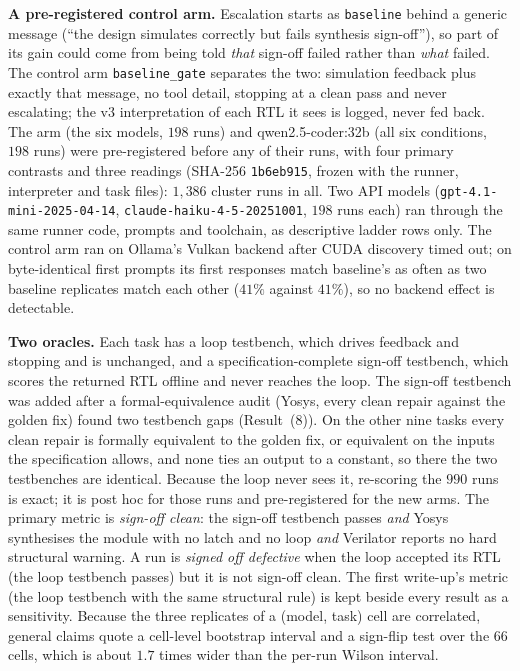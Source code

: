 \documentclass[11pt]{article}
\begin{document}
\textbf{A pre-registered control arm.} Escalation starts as \texttt{baseline}
behind a generic message (``the design simulates correctly but fails synthesis
sign-off''), so part of its gain could come from being told \emph{that}
sign-off failed rather than \emph{what} failed. The control arm
\texttt{baseline\_gate} separates the two: simulation feedback plus exactly
that message, no tool detail, stopping at a clean pass and never escalating;
the v3 interpretation of each RTL it sees is logged, never fed back. The arm
(the six models, $198$ runs) and qwen2.5-coder:32b (all six conditions, $198$
runs) were pre-registered before any of their runs, with four primary
contrasts and three readings (SHA-256 \texttt{1b6eb915}, frozen with the
runner, interpreter and task files): $1{,}386$ cluster runs in all. Two API
models (\texttt{gpt-4.1-mini-2025-04-14}, \texttt{claude-haiku-4-5-20251001},
$198$ runs each) ran through the same runner code, prompts and toolchain, as
descriptive ladder rows only. The control arm ran on Ollama's Vulkan backend
after CUDA discovery timed out; on byte-identical first prompts its first
responses match baseline's as often as two baseline replicates match each
other ($41\%$ against $41\%$), so no backend effect is detectable.

\textbf{Two oracles.} Each task has a loop testbench, which drives feedback and
stopping and is unchanged, and a specification-complete sign-off testbench,
which scores the returned RTL offline and never reaches the loop. The sign-off
testbench was added after a formal-equivalence audit (Yosys, every clean
repair against the golden fix) found two testbench gaps (Result~(8)). On
the other nine tasks every clean repair is formally equivalent to the golden
fix, or equivalent on the inputs the specification allows, and none ties an
output to a constant, so there the two testbenches are identical. Because the
loop never sees it, re-scoring the $990$ runs is exact; it is post hoc for
those runs and pre-registered for the new arms. The primary metric is
\emph{sign-off clean}: the sign-off testbench passes \emph{and} Yosys
synthesises the module with no latch and no loop \emph{and} Verilator reports
no hard structural warning. A run is \emph{signed off defective} when the loop
accepted its RTL (the loop testbench passes) but it is not sign-off clean. The
first write-up's metric (the loop testbench with the same structural rule) is
kept beside every result as a sensitivity. Because the three replicates of a
(model, task) cell are correlated, general claims quote a cell-level bootstrap
interval and a sign-flip test over the $66$ cells, which is about $1.7$ times
wider than the per-run Wilson interval.
\end{document}
